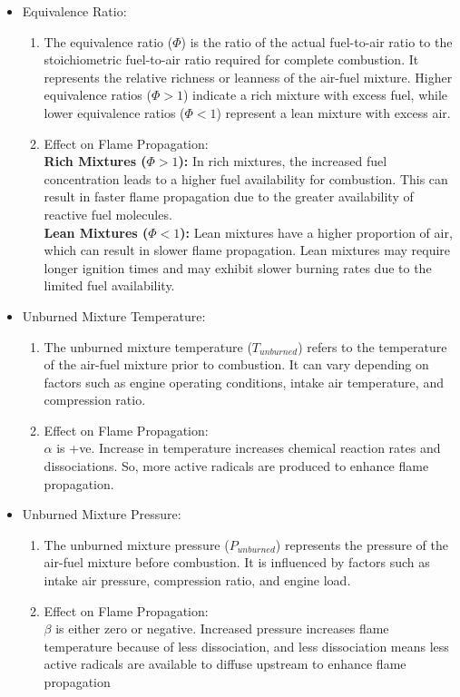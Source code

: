 \documentclass{article}
\begin{document}
  \begin{itemize}
  \item Equivalence Ratio:
  \begin{enumerate}
    \item The equivalence ratio ($\Phi$) is the ratio of the actual fuel-to-air ratio to the stoichiometric fuel-to-air ratio required for complete combustion. It represents the relative richness or leanness of the air-fuel mixture. Higher equivalence ratios ($\Phi > 1$) indicate a rich mixture with excess fuel, while lower equivalence ratios ($\Phi < 1$) represent a lean mixture with excess air.
    \item  Effect on Flame Propagation:\\
    \textbf{Rich Mixtures ($\Phi > 1$):} In rich mixtures, the increased fuel concentration leads to a higher fuel availability for combustion. This can result in faster flame propagation due to the greater availability of reactive fuel molecules.\\
    \textbf{Lean Mixtures ($\Phi < 1$):} Lean mixtures have a higher proportion of air, which can result in slower flame propagation. Lean mixtures may require longer ignition times and may exhibit slower burning rates due to the limited fuel availability.
  \end{enumerate}
  
  
  
  
  \item Unburned Mixture Temperature:
    \begin{enumerate}
      \item The unburned mixture temperature ($T_{unburned}$) refers to the temperature of the air-fuel mixture prior to combustion. It can vary depending on factors such as engine operating conditions, intake air temperature, and compression ratio.
      \item Effect on Flame Propagation:\\
      $\alpha$ is +ve. Increase in temperature increases chemical reaction rates and dissociations. So, more active radicals are produced to enhance flame
      propagation.
    \end{enumerate}
   
  
  \item Unburned Mixture Pressure:
  \begin{enumerate}
    \item The unburned mixture pressure ($P_{unburned}$) represents the pressure of the air-fuel mixture before combustion. It is influenced by factors such as intake air pressure, compression ratio, and engine load.
    \item Effect on Flame Propagation:\\
    $\beta$ is either zero or negative. Increased pressure increases flame temperature
    because of less dissociation, and less dissociation means less active radicals are available to diffuse upstream to enhance flame propagation
  \end{enumerate}
   
  
\end{itemize}
\end{document}
